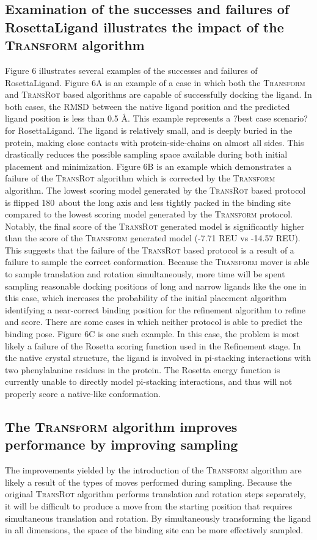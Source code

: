 \subsection{Examination of the successes and failures of RosettaLigand illustrates the impact of the \textsc{Transform} algorithm}
Figure 6 illustrates several examples of the successes and failures of RosettaLigand.
Figure 6A is an example of a case in which both the \textsc{Transform} and \textsc{TransRot} based algorithms are capable of successfully docking the ligand.
In both cases, the RMSD between the native ligand position and the predicted ligand position is less than 0.5 \AA.  This example represents a ?best case scenario? for RosettaLigand.
The ligand is relatively small, and is deeply buried in the protein, making close contacts with protein-side-chains on almost all sides.
This drastically reduces the possible sampling space available during both initial placement and minimization.
Figure 6B is an example which demonstrates a failure of the \textsc{TransRot} algorithm which is corrected by the \textsc{Transform} algorithm.
The lowest scoring model generated by the \textsc{TransRot} based protocol is flipped 180\textdegree\ about the long axis and less tightly packed in the binding site compared to the lowest scoring model generated by the \textsc{Transform} protocol.
Notably, the final score of the \textsc{TransRot} generated model is significantly higher than the score of the \textsc{Transform} generated model (-7.71 REU vs -14.57 REU). 
This suggests that the failure of the \textsc{TransRot} based protocol is a result of a failure to sample the correct conformation.
Because the \textsc{Transform} mover is able to sample translation and rotation simultaneously, more time will be spent sampling reasonable docking positions of long and narrow ligands like the one in this case, which increases the probability of the initial placement algorithm identifying a near-correct binding position for the refinement algorithm to refine and score.
There are some cases in which neither protocol is able to predict the binding pose.
Figure 6C is one such example.  In this case, the problem is most likely a failure of the Rosetta scoring function used in the Refinement stage.
In the native crystal structure, the ligand is involved in pi-stacking interactions with two phenylalanine residues in the protein.
The Rosetta energy function is currently unable to directly model pi-stacking interactions, and thus will not properly score a native-like conformation. 

\subsection{The \textsc{Transform} algorithm improves performance by improving sampling}
The improvements yielded by the introduction of the \textsc{Transform} algorithm are likely a result of the types of moves performed during sampling.
Because the original \textsc{TransRot} algorithm performs translation and rotation steps separately, it will be difficult to produce a move from the starting position that requires simultaneous translation and rotation.
By simultaneously transforming the ligand in all dimensions, the space of the binding site can be more effectively sampled. 

